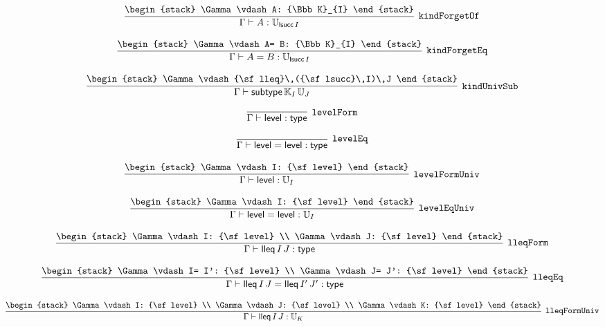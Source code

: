 \[
\infer[{\tt kindForgetOf}]{\Gamma \vdash A: {\Bbb U}_{{\sf lsucc}\,I}}{
\begin{stack}
\Gamma \vdash A: {\Bbb K}_{I}
\end{stack}}
\]

\[
\infer[{\tt kindForgetEq}]{\Gamma \vdash A= B: {\Bbb U}_{{\sf lsucc}\,I}}{
\begin{stack}
\Gamma \vdash A= B: {\Bbb K}_{I}
\end{stack}}
\]

\[
\infer[{\tt kindUnivSub}]{\Gamma \vdash {\sf subtype}\,{\Bbb K}_{I}\,{\Bbb U}_{J}}{
\begin{stack}
\Gamma \vdash {\sf lleq}\,({\sf lsucc}\,I)\,J
\end{stack}}
\]

\[
\infer[{\tt levelForm}]{\Gamma \vdash {\sf level}: {\sf type}}{}
\]

\[
\infer[{\tt levelEq}]{\Gamma \vdash {\sf level}= {\sf level}: {\sf type}}{}
\]

\[
\infer[{\tt levelFormUniv}]{\Gamma \vdash {\sf level}: {\Bbb U}_{I}}{
\begin{stack}
\Gamma \vdash I: {\sf level}
\end{stack}}
\]

\[
\infer[{\tt levelEqUniv}]{\Gamma \vdash {\sf level}= {\sf level}: {\Bbb U}_{I}}{
\begin{stack}
\Gamma \vdash I: {\sf level}
\end{stack}}
\]

\[
\infer[{\tt lleqForm}]{\Gamma \vdash {\sf lleq}\,I\,J: {\sf type}}{
\begin{stack}
\Gamma \vdash I: {\sf level}
\\
\Gamma \vdash J: {\sf level}
\end{stack}}
\]

\[
\infer[{\tt lleqEq}]{\Gamma \vdash {\sf lleq}\,I\,J= {\sf lleq}\,I'\,J': {\sf type}}{
\begin{stack}
\Gamma \vdash I= I': {\sf level}
\\
\Gamma \vdash J= J': {\sf level}
\end{stack}}
\]

\[
\infer[{\tt lleqFormUniv}]{\Gamma \vdash {\sf lleq}\,I\,J: {\Bbb U}_{K}}{
\begin{stack}
\Gamma \vdash I: {\sf level}
\\
\Gamma \vdash J: {\sf level}
\\
\Gamma \vdash K: {\sf level}
\end{stack}}
\]

